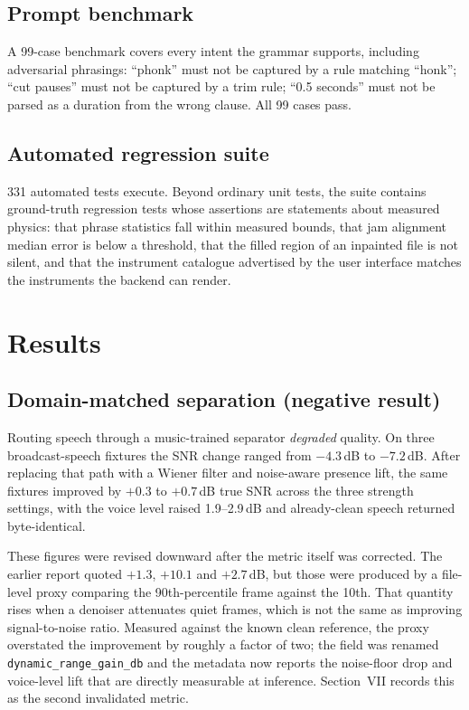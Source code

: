 \documentclass[conference]{IEEEtran}
\begin{document}
\subsection{Prompt benchmark}

A 99-case benchmark covers every intent the grammar supports, including
adversarial phrasings: ``phonk'' must not be captured by a rule matching
``honk''; ``cut pauses'' must not be captured by a trim rule; ``0.5 seconds''
must not be parsed as a duration from the wrong clause. All 99 cases pass.

\subsection{Automated regression suite}

331 automated tests execute. Beyond ordinary unit tests, the suite contains
ground-truth regression tests whose assertions are statements about measured
physics: that phrase statistics fall within measured bounds, that jam alignment
median error is below a threshold, that the filled region of an inpainted file
is not silent, and that the instrument catalogue advertised by the user
interface matches the instruments the backend can render.

\section{Results}

\subsection{Domain-matched separation (negative result)}

Routing speech through a music-trained separator \emph{degraded} quality. On
three broadcast-speech fixtures the SNR change ranged from $-4.3$\,dB to
$-7.2$\,dB. After replacing that path with a Wiener filter and noise-aware
presence lift, the same fixtures improved by $+0.3$ to $+0.7$\,dB true SNR
across the three strength settings, with the voice level raised 1.9--2.9\,dB
and already-clean speech returned byte-identical.

These figures were revised downward after the metric itself was corrected. The
earlier report quoted $+1.3$, $+10.1$ and $+2.7$\,dB, but those were produced
by a file-level proxy comparing the 90th-percentile frame against the 10th.
That quantity rises when a denoiser attenuates quiet frames, which is not the
same as improving signal-to-noise ratio. Measured against the known clean
reference, the proxy overstated the improvement by roughly a factor of two; the
field was renamed \texttt{dynamic\_range\_gain\_db} and the metadata now
reports the noise-floor drop and voice-level lift that are directly measurable
at inference. Section~VII records this as the second invalidated metric.
\end{document}
